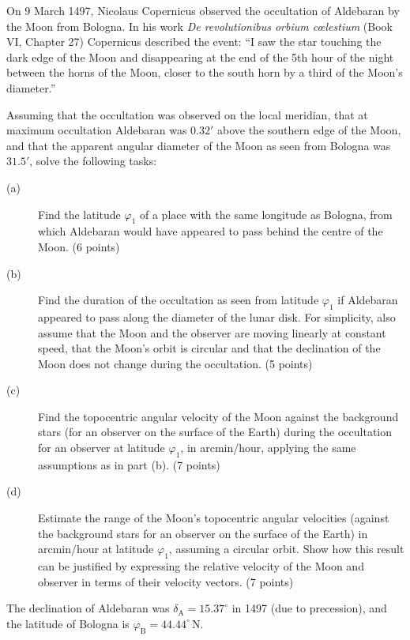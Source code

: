 On 9 March 1497, Nicolaus Copernicus observed the occultation of Aldebaran by
the Moon from Bologna. In his work \textit{De revolutionibus orbium
c\oe lestium} (Book VI, Chapter 27) Copernicus described the event: ``I saw the
star touching the dark edge of the Moon and disappearing at the end of the 5th
hour of the night between the horns of the Moon, closer to the south horn by a
third of the Moon's diameter.''

Assuming that the occultation was observed on the local meridian, that at
maximum occultation Aldebaran was $0.32'$ above the southern edge of the Moon,
and that the apparent angular diameter of the Moon as seen from Bologna was
$31.5'$, solve the following tasks:

\begin{description}
\item[(a)] Find the latitude $\varphi_1$ of a place with the same longitude as
  Bologna, from which Aldebaran would have appeared to pass behind the centre
  of the Moon. (6 points)
\item[(b)] Find the duration of the occultation as seen from latitude
  $\varphi_1$ if Aldebaran appeared to pass along the diameter of the lunar
  disk. For simplicity, also assume that the Moon and the observer are moving
  linearly at constant speed, that the Moon's orbit is circular and that the
  declination of the Moon does not change during the occultation. (5 points)
\item[(c)] Find the topocentric angular velocity of the Moon against the
  background stars (for an observer on the surface of the Earth) during the
  occultation for an observer at latitude $\varphi_1$, in arcmin/hour, applying
  the same assumptions as in part (b). (7 points)
\item[(d)] Estimate the range of the Moon's topocentric angular velocities
  (against the background stars for an observer on the surface of the Earth) in
  arcmin/hour at latitude $\varphi_1$, assuming a circular orbit. Show how this
  result can be justified by expressing the relative velocity of the Moon and
  observer in terms of their velocity vectors. (7 points)
\end{description}

The declination of Aldebaran was $\delta_{\mathrm{A}} = 15.37^\circ$ in 1497
(due to precession), and the latitude of Bologna is
$\varphi_{\mathrm{B}} = 44.44^\circ$\,N.
